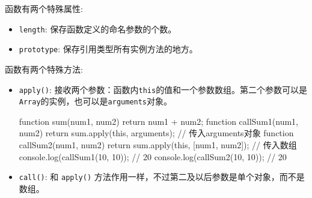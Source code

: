 函数有两个特殊属性:
\begin{itemize}
    \item \texttt{length}: 保存函数定义的命名参数的个数。
    \item \texttt{prototype}: 保存引用类型所有实例方法的地方。
\end{itemize}

函数有两个特殊方法:
\begin{itemize}
    \item \texttt{apply()}: 接收两个参数：函数内\texttt{this}的值和一个参数数组。第二个参数可以是\texttt{Array}的实例，也可以是\texttt{arguments}对象。
\begin{JavaScript}
function sum(num1, num2) {
    return num1 + num2;
}
function callSum1(num1, num2) {
    return sum.apply(this, arguments);
    // 传入arguments对象
}
function callSum2(num1, num2) {
    return sum.apply(this, [num1, num2]); // 传入数组
}
console.log(callSum1(10, 10));  // 20 
console.log(callSum2(10, 10));  // 20 
\end{JavaScript}
    \item \texttt{call()}: 和 \texttt{apply()} 方法作用一样，不过第二及以后参数是单个对象，而不是数组。
\end{itemize}




\newpage